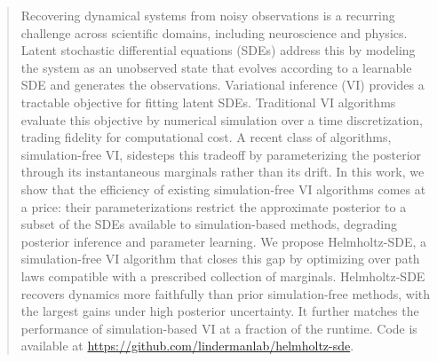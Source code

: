 \begin{abstract}
Recovering dynamical systems from noisy observations is a recurring challenge across scientific domains, including neuroscience and physics. 
Latent stochastic differential equations (SDEs) address this by modeling the system as an unobserved state that evolves according to a learnable SDE and generates the observations.
Variational inference (VI) provides a tractable objective for fitting latent SDEs. 
Traditional VI algorithms evaluate this objective by numerical simulation over a time discretization, trading fidelity for computational cost.
A recent class of algorithms, simulation-free VI, sidesteps this tradeoff by parameterizing the posterior through its instantaneous marginals rather than its drift.
In this work, we show that the efficiency of existing simulation-free VI algorithms comes at a price: their parameterizations restrict the approximate posterior to a subset of the SDEs available to simulation-based methods, degrading posterior inference and parameter learning. 
We propose Helmholtz-SDE, a simulation-free VI algorithm that closes this gap by optimizing over path laws compatible with a prescribed collection of marginals. 
Helmholtz-SDE recovers dynamics more faithfully than prior simulation-free methods, with the largest gains under high posterior uncertainty.
It further matches the performance of simulation-based VI at a fraction of the runtime.
Code is available at \url{https://github.com/lindermanlab/helmholtz-sde}.
\end{abstract}